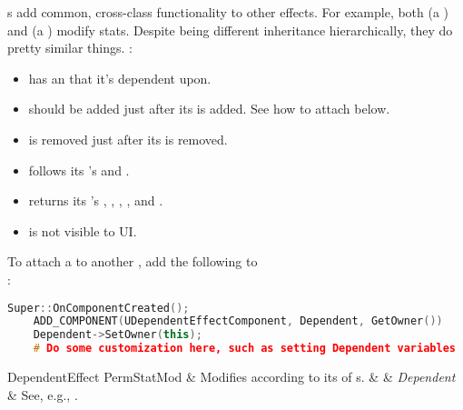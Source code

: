 



s add common, cross-class functionality to other effects. For example, both  (a ) and  (a ) modify stats. Despite being different inheritance hierarchically, they do pretty similar things. :
\begin{itemize}
	\item{has an  that it's dependent upon.}
	\item{should be added just after its  is added. See how to attach below.}
	\item{is removed just after its  is removed.}
	\item{follows its 's  and .}
	\item{returns its 's , , , , and .}
	\item{is not visible to UI.}
\end{itemize}
To attach a  to another , add the following to\\:
\begin{lstlisting}[language=c++]
	Super::OnComponentCreated();
	ADD_COMPONENT(UDependentEffectComponent, Dependent, GetOwner())
	Dependent->SetOwner(this);
	# Do some customization here, such as setting Dependent variables
\end{lstlisting}

\begin{EffectTable}{DependentEffect}
	PermStatMod	& {Modifies according to its  of s.}	&  & \textit{Dependent} & See, e.g., .\\
\end{EffectTable}


\postamble{}